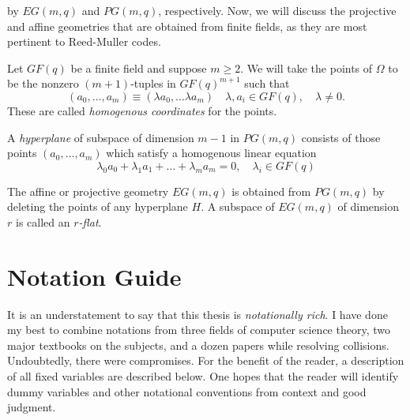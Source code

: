 \documentclass[12pt,twoside]{reedthesis}
\theoremstyle{definition}
\begin{document}
 by $EG(m,q)$ and $PG(m,q)$, respectively. Now, we will discuss the projective and affine geometries that are obtained from finite fields, as they are most pertinent to Reed-Muller codes.

Let $GF(q)$ be a finite field and suppose $m \geq 2$. We will take the points of $\Omega$ to be the nonzero $(m+1)$-tuples in $GF(q)^{m+1}$ such that
\begin{equation*}
(a_0, \ldots, a_m) \equiv (\lambda a_0, \ldots \lambda a_m) \quad \lambda, a_i \in GF(q), \quad \lambda \neq 0.
\end{equation*}
These are called \textit{homogenous coordinates} for the points. 

A \textit{hyperplane} of subspace of dimension $m-1$ in $PG(m,q)$ consists of those points $(a_0, \ldots , a_m)$ which satisfy a homogenous linear equation 
\begin{equation*}
\lambda_0 a_0 + \lambda_1 a_1 + \ldots + \lambda_m a_m = 0, \quad \lambda_i \in GF(q)
\end{equation*}

The affine or projective geometry $EG(m,q)$ is obtained from $PG(m,q)$ by deleting the points of any hyperplane $H$. A subspace of $EG(m,q)$ of dimension $r$ is called an \textit{$r$-flat}. 

\chapter{Notation Guide}
It is an understatement to say that this thesis is \emph{notationally rich}. I have done my best to combine notations from three fields of computer science theory, two major textbooks on the subjects, and a dozen papers while resolving collisions. Undoubtedly, there were compromises. For the benefit of the reader, a description of all fixed variables are described below. One hopes that the reader will identify dummy variables and other notational conventions from context and good judgment. 
\end{document}
